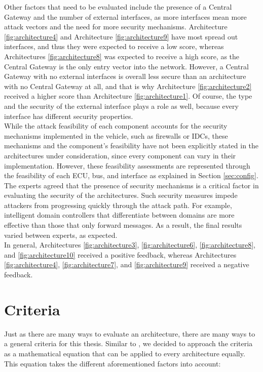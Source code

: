 Other factors that need to be evaluated include the presence of a Central Gateway and the number of external interfaces, as more interfaces mean more attack vectors and the need for more security mechanisms.
Architecture \ref{fig:architecture4} and Architecture \ref{fig:architecture9} have most spread out interfaces, and thus they were expected to receive a low score,
whereas Architectures \ref{fig:architecture8} was expected to receive a high score, as the Central Gateway is the only entry vector into the network.
However, a Central Gateway with no external interfaces is overall less secure than an architecture with no Central Gateway at all, and that is why 
Architecture \ref{fig:architecture2} received a higher score than Architecture \ref{fig:architecture1}. 
Of course, the type and the security of the external interface plays a role as well, because every interface has different security properties.\\

While the attack feasibility of each component accounts for the security mechanisms implemented in the vehicle, such as firewalls or IDCs, 
these mechanisms and the component's feasibility have not been explicitly stated in the architectures under consideration, since every component can vary in their implementation.
However, these feasibility assessments are represented through the feasibility of each ECU, bus, and interface as explained in Section \ref{sec:config}.
The experts agreed that the presence of security mechanisms is a critical factor in evaluating the security of the architectures.
Such security measures impede attackers from progressing quickly through the attack path. 
For example, intelligent domain controllers that differentiate between domains are more effective than those that only forward messages.
As a result, the final results varied between experts, as expected.\\

In general, Architectures \ref{fig:architecture3}, \ref{fig:architecture6}, \ref{fig:architecture8}, and \ref{fig:architecture10} received a positive feedback,
whereas Architectures \ref{fig:architecture4}, \ref{fig:architecture7}, and \ref{fig:architecture9} received a negative feedback.

\section{Criteria}

Just as there are many ways to evaluate an architecture, there are many ways to a general criteria for this thesis.
Similar to \cite{threat_surf}, we decided to approach the criteria as a mathematical equation that can be applied to every architecture equally.
This equation takes the different aforementioned factors into account:

